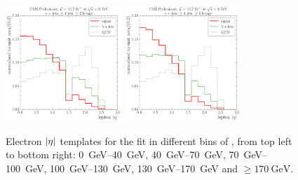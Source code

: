 \begin{figure}[!htbp]
    \hspace*{\fill} \\
    \hspace*{\fill}
    {\includegraphics[width=0.39\textwidth]{measurement/WPT/central/fit_templates/electron_templates_bin_130-170}}\hfill
    {\includegraphics[width=0.39\textwidth]{measurement/WPT/central/fit_templates/electron_templates_bin_170-inf}}
    \hspace*{\fill}
    \caption{Electron $\lvert \eta \rvert$ templates for the fit in different bins of \WPT,
    from top left to bottom right: \SIrange{0}{40}{\GeV}, \SIrange{40}{70}{\GeV},
    \SIrange{70}{100}{\GeV}, \SIrange{100}{130}{\GeV}, \SIrange{130}{170}{\GeV} and $\geq \SI{170}{\GeV}$.}
    \label{fig:fit_tempaltes_WPT_electron}
\end{figure}

